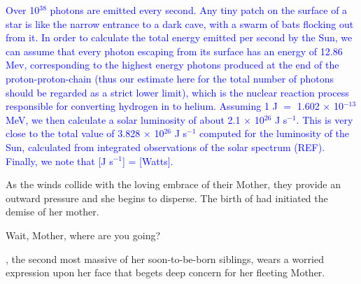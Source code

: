 \documentclass[main.tex]{subfiles}
\begin{document}
\begin{tcolorbox}[sharp corners, colback=blue!30, colframe=blue!80!blue, title=Stellar luminosity]
\par \textcolor{blue} {Over 10$^{38}$ photons are emitted every second.  Any tiny patch on the surface of a star is like the narrow entrance to a dark cave, with a swarm of bats flocking out from it.  In order to calculate the total energy emitted per second by the Sun, we can assume that every photon escaping from its surface has an energy of 12.86 Mev, corresponding to the highest energy photons produced at the end of the proton-proton-chain (thus our estimate here for the total number of photons should be regarded as a strict lower limit), which is the nuclear reaction process responsible for converting hydrogen in to helium.  Assuming 1 J $=$ 1.602 $\times$ 10$^{-13}$ MeV, we then calculate a solar luminosity of about 2.1 ${\times}$ 10$^{26}$ J s$^{-1}$.  This is very close to the total value of 3.828 $\times$ 10$^{26}$ J s$^{-1}$ computed for the luminosity of the Sun, calculated from integrated observations of the solar spectrum (REF). Finally, we note that [J s$^{-1}$] = [Watts].}  
\end{tcolorbox}

\par \nar As the winds collide with the loving embrace of their Mother, they provide an outward pressure and she begins to disperse.  The birth of \rmmaia had initiated the demise of her mother.  

\par \Maia Wait, Mother, where are you going?  

\par \nar \rmmaia, the second most massive of her soon-to-be-born siblings, wears a worried expression upon her face that begets deep concern for her fleeting Mother.  




\end{document}

